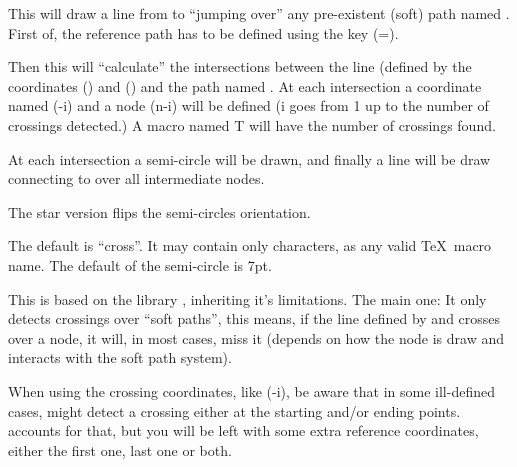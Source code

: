 \documentclass[10pt]{article}
\begin{document}
\begin{codedescribe}{\pathcross}
\begin{codesyntax}%
\tsobj{\pathcross*}
\end{codesyntax}
This will draw a line from  to  ``jumping over'' any pre-existent (soft) path named .
First of, the reference path  has to be defined using the  key (=).

Then this will ``calculate'' the intersections between the line (defined by the coordinates () and () and the path named . At each intersection a coordinate named (-i) and a node (n-i) will be defined (i goes from 1 up to the number of crossings detected.) A macro named T will have the number of crossings found. 

At each intersection a semi-circle will be drawn, and finally a line will be draw connecting  to  over all intermediate nodes.

The  star version flips the semi-circles orientation.
\begin{tsremark}
  The default  is ``cross''. It may contain only characters, as any valid \TeX\ macro name. The default  of the semi-circle is 7pt.
\end{tsremark}
\begin{tsremark}
  This is based on the  library , inheriting it's limitations. The main one: It only detects crossings over ``soft paths'', this means, if the line defined by  and  crosses over a node, it will, in most cases, miss it (depends on how the node is draw and interacts with the soft path system).
\end{tsremark}
\begin{tsremark}
  When using the crossing coordinates, like (-i), be aware that in some ill-defined cases,  might detect a crossing either at the starting and/or ending points. \tsobj{\pathcross} accounts for that, but you will be left with some extra reference coordinates, either the first one, last one or both.
\end{tsremark}
\end{codedescribe}
\end{document}
